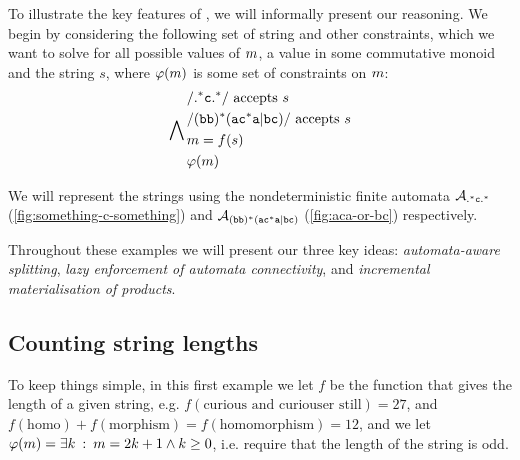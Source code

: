 \documentclass[acmsmall,review,anonymous,screen]{acmart}\settopmatter{printfolios=true,printccs=false,printacmref=true}
\theoremstyle{definition}
\begin{document}
To illustrate the key features of \Calculus, we will informally present our
reasoning. We begin by considering the following set of string and other
constraints, which we want to solve for all possible values of $m$,
a value in some commutative monoid and the string $s$, where
$\varphi(m)$ is some set of constraints on $m$:
\begin{equation*}
  \bigwedge\limits_{} \begin{aligned}
  & \mathtt{/}\mathtt{.^\ast{}c.^\ast}{}\mathtt{/} \text{ accepts } s\\
  & \mathtt{/}\mathtt{(bb)^\ast(ac^\ast{}a|bc)}{}\mathtt{/} \text{ accepts } s \\
  & m = f(s) \\
  & \varphi(m)
  \end{aligned}
 \end{equation*}

We will represent the strings using the nondeterministic finite automata
 $\mathcal{A}_{\mathtt{.^\ast{}c.^\ast}}{}$ (\cref{fig:something-c-something}) and $\mathcal{A}_{\mathtt{(bb)^\ast(ac^\ast{}a|bc)}}{}$
 (\cref{fig:aca-or-bc}) respectively.

 Throughout these examples we will present our three key ideas:
 \emph{automata-aware splitting}, \emph{lazy enforcement of automata
 connectivity}, and \emph{incremental materialisation of products}.
 
\subsection{Counting string lengths}

To keep things simple, in this first example we let $f$ be the function that
gives the length of a given string, e.g. $f\left(\text{curious and curiouser
still}\right) = 27$, and $f\left(\text{homo}\right) +
f\left(\text{morphism}\right) = f\left(\text{homomorphism}\right) = 12$, and we
let $\varphi(m) = \exists k \::\: m = 2k + 1 \land k \geq 0$,
i.e. require that the length of the string is odd.
\end{document}
